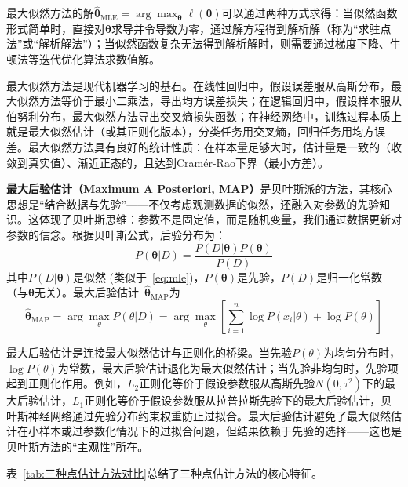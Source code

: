 最大似然方法的解$\hat{\boldsymbol{\theta}}_{\text{MLE}} = \arg\max_{\boldsymbol{\theta}} \ell(\boldsymbol{\theta})$可以通过两种方式求得：当似然函数形式简单时，直接对$\boldsymbol{\theta}$求导并令导数为零，通过解方程得到解析解（称为``求驻点法''或``解析解法''）；当似然函数复杂无法得到解析解时，则需要通过梯度下降、牛顿法等迭代优化算法求数值解。

最大似然方法是现代机器学习的基石。在线性回归中，假设误差服从高斯分布，最大似然方法等价于最小二乘法，导出均方误差损失；在逻辑回归中，假设样本服从伯努利分布，最大似然方法导出交叉熵损失函数；在神经网络中，训练过程本质上就是最大似然估计（或其正则化版本），分类任务用交叉熵，回归任务用均方误差。最大似然方法具有良好的统计性质：在样本量足够大时，估计量是一致的（收敛到真实值）、渐近正态的，且达到Cramér-Rao下界（最小方差）。

\textbf{最大后验估计（Maximum A Posteriori, MAP）}是贝叶斯派的方法，其核心思想是``结合数据与先验''——不仅考虑观测数据的似然，还融入对参数的先验知识。这体现了贝叶斯思维：参数不是固定值，而是随机变量，我们通过数据更新对参数的信念。根据贝叶斯公式，后验分布为：
\begin{equation*}
P(\boldsymbol{\theta}|D) = \frac{P(D|\boldsymbol{\theta})P(\boldsymbol{\theta})}{P(D)}
\end{equation*}
其中$P(D|\boldsymbol{\theta})$是似然 (类似于~\eqref{eq:mle})，$P(\boldsymbol{\theta})$是先验，$P(D)$是归一化常数（与$\boldsymbol{\theta}$无关）。最大后验估计~$\hat{\boldsymbol{\theta}}_{\text{MAP}}$为
\begin{equation*}
\hat{\boldsymbol{\theta}}_{\text{MAP}} = \arg\max_\theta P(\theta|D) = \arg\max_\theta \left[\sum_{i=1}^n \log P(x_i|\theta) + \log P(\theta)\right]
\end{equation*}

最大后验估计是连接最大似然估计与正则化的桥梁。当先验$P(\theta)$为均匀分布时，$\log P(\theta)$为常数，最大后验估计退化为最大似然估计；当先验非均匀时，先验项起到正则化作用。例如，$L_2$正则化等价于假设参数服从高斯先验$N(0, \tau^2)$下的最大后验估计，$L_1$正则化等价于假设参数服从拉普拉斯先验下的最大后验估计，贝叶斯神经网络通过先验分布约束权重防止过拟合。最大后验估计避免了最大似然估计在小样本或过参数化情况下的过拟合问题，但结果依赖于先验的选择——这也是贝叶斯方法的``主观性''所在。

表~\ref{tab:三种点估计方法对比}总结了三种点估计方法的核心特征。

